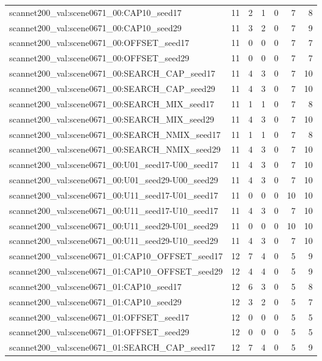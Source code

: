 \begin{table}[t]
\begin{tabular}{lrrrrrr}
scannet200\_val:scene0671\_00:CAP10\_seed17 & 11 & 2 & 1 & 0 & 7 & 8 \\
scannet200\_val:scene0671\_00:CAP10\_seed29 & 11 & 3 & 2 & 0 & 7 & 9 \\
scannet200\_val:scene0671\_00:OFFSET\_seed17 & 11 & 0 & 0 & 0 & 7 & 7 \\
scannet200\_val:scene0671\_00:OFFSET\_seed29 & 11 & 0 & 0 & 0 & 7 & 7 \\
scannet200\_val:scene0671\_00:SEARCH\_CAP\_seed17 & 11 & 4 & 3 & 0 & 7 & 10 \\
scannet200\_val:scene0671\_00:SEARCH\_CAP\_seed29 & 11 & 4 & 3 & 0 & 7 & 10 \\
scannet200\_val:scene0671\_00:SEARCH\_MIX\_seed17 & 11 & 1 & 1 & 0 & 7 & 8 \\
scannet200\_val:scene0671\_00:SEARCH\_MIX\_seed29 & 11 & 4 & 3 & 0 & 7 & 10 \\
scannet200\_val:scene0671\_00:SEARCH\_NMIX\_seed17 & 11 & 1 & 1 & 0 & 7 & 8 \\
scannet200\_val:scene0671\_00:SEARCH\_NMIX\_seed29 & 11 & 4 & 3 & 0 & 7 & 10 \\
scannet200\_val:scene0671\_00:U01\_seed17-U00\_seed17 & 11 & 4 & 3 & 0 & 7 & 10 \\
scannet200\_val:scene0671\_00:U01\_seed29-U00\_seed29 & 11 & 4 & 3 & 0 & 7 & 10 \\
scannet200\_val:scene0671\_00:U11\_seed17-U01\_seed17 & 11 & 0 & 0 & 0 & 10 & 10 \\
scannet200\_val:scene0671\_00:U11\_seed17-U10\_seed17 & 11 & 4 & 3 & 0 & 7 & 10 \\
scannet200\_val:scene0671\_00:U11\_seed29-U01\_seed29 & 11 & 0 & 0 & 0 & 10 & 10 \\
scannet200\_val:scene0671\_00:U11\_seed29-U10\_seed29 & 11 & 4 & 3 & 0 & 7 & 10 \\
scannet200\_val:scene0671\_01:CAP10\_OFFSET\_seed17 & 12 & 7 & 4 & 0 & 5 & 9 \\
scannet200\_val:scene0671\_01:CAP10\_OFFSET\_seed29 & 12 & 4 & 4 & 0 & 5 & 9 \\
scannet200\_val:scene0671\_01:CAP10\_seed17 & 12 & 6 & 3 & 0 & 5 & 8 \\
scannet200\_val:scene0671\_01:CAP10\_seed29 & 12 & 3 & 2 & 0 & 5 & 7 \\
scannet200\_val:scene0671\_01:OFFSET\_seed17 & 12 & 0 & 0 & 0 & 5 & 5 \\
scannet200\_val:scene0671\_01:OFFSET\_seed29 & 12 & 0 & 0 & 0 & 5 & 5 \\
scannet200\_val:scene0671\_01:SEARCH\_CAP\_seed17 & 12 & 7 & 4 & 0 & 5 & 9 \\

\end{tabular}
\end{table}
